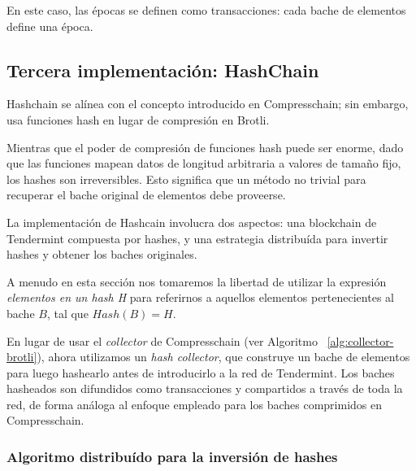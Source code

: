 %
En este caso, las épocas se definen como transacciones: cada bache de elementos define una época.


\subsection{Tercera implementación: HashChain}\label{subsec:hashchain}
%
Hashchain se alínea con el concepto introducido en Compresschain; sin embargo, usa
funciones hash en lugar de compresión en Brotli.

%
Mientras que el poder de compresión de funciones hash puede ser enorme, dado que las funciones
mapean datos de longitud arbitraria a valores de tamaño fijo, los hashes son irreversibles. Esto
significa que un método no trivial para recuperar el bache original de elementos debe proveerse.

%
La implementación de Hashcain involucra dos aspectos: una blockchain de Tendermint compuesta por hashes,
y una estrategia distribuída para invertir hashes y obtener los baches originales.
%

A menudo en esta sección nos tomaremos la libertad de utilizar la expresión \textit{elementos en un hash H}
para referirnos a aquellos elementos pertenecientes al bache $B$, tal que $Hash(B) = H$.

En lugar de usar el \textit{collector} de Compresschain (ver Algoritmo ~\ref{alg:collector-brotli}),
ahora utilizamos un \textit{hash collector}, que construye un bache de elementos para luego hashearlo
antes de introducirlo a la red de Tendermint.
%
Los baches hasheados son difundidos como transacciones y compartidos a través de toda la red, de forma
análoga al enfoque empleado para los baches comprimidos en Compresschain.

\subsubsection{Algoritmo distribuído para la inversión de hashes}

